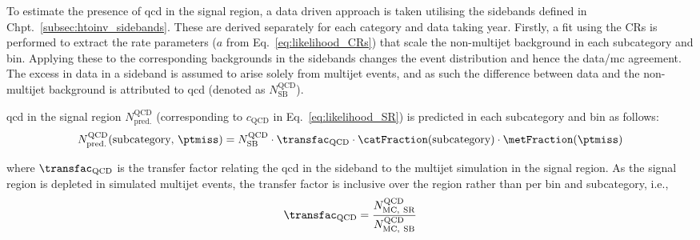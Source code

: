 To estimate the presence of \acrshort{qcd} in the signal region, a data driven approach is taken utilising the sidebands defined in Chpt.~\ref{subsec:htoinv_sidebands}. These are derived separately for each category and data taking year. Firstly, a fit using the \glspl{CR} is performed to extract the rate parameters ($a$ from Eq.~\ref{eq:likelihood_CRs}) that scale the non-multijet background in each subcategory and \ptmiss bin. Applying these to the corresponding backgrounds in the sidebands changes the event distribution and hence the data/\acrshort{mc} agreement. The excess in data in a sideband is assumed to arise solely from multijet events, and as such the difference between data and the non-multijet background is attributed to \acrshort{qcd} (denoted as $N_{\mathrm{SB}}^{\mathrm{QCD}}$).

\acrshort{qcd} in the signal region $N_{\mathrm{pred.}}^{\mathrm{QCD}}$ (corresponding to $c_{\mathrm{QCD}}$ in Eq.~\ref{eq:likelihood_SR}) is predicted in each subcategory and \ptmiss bin as follows: 
\begin{equation}
    N_{\mathrm{pred.}}^{\mathrm{QCD}}(\text{subcategory}, \, \ptmiss) = N_{\mathrm{SB}}^{\mathrm{QCD}} \cdot \transfac_{\mathrm{QCD}} \cdot \catFraction(\text{subcategory}) \cdot \metFraction(\ptmiss)
    \label{eq:qcd_prediction}
\end{equation}

where $\transfac_{\mathrm{QCD}}$ is the transfer factor relating the \acrshort{qcd} in the sideband to the multijet simulation in the signal region. As the signal region is depleted in simulated multijet events, the transfer factor is inclusive over the region rather than per \ptmiss bin and subcategory, i.e.,
\begin{equation}
    \transfac_{\mathrm{QCD}} = \frac{ N_{\mathrm{MC, \ SR}}^{\mathrm{QCD}} } { N_{\mathrm{MC, \ SB}}^{\mathrm{QCD}} }
    \label{eq:transfer_factor_qcd}
\end{equation}

